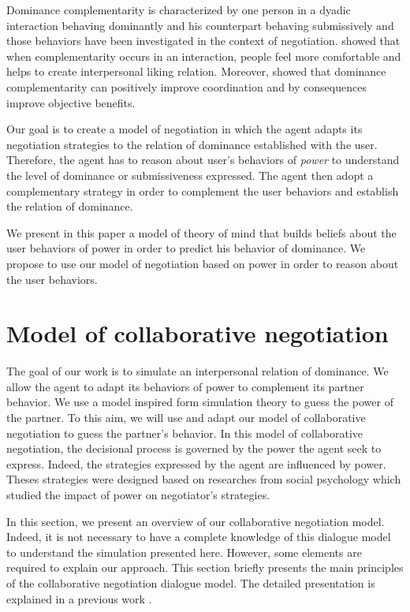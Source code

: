 \documentclass[conference, letterpaper]{IEEEtran}
\begin{document}
	Dominance complementarity is characterized by one person in a dyadic interaction behaving dominantly and his counterpart behaving submissively \cite{tiedens2003power} and those behaviors have been investigated in the context of negotiation. \cite{tiedens2003power} showed that when complementarity occurs in an interaction, people feel more comfortable and helps to create interpersonal liking relation.
	Moreover, \cite{wiltermuth2015benefits} showed that dominance complementarity can positively improve coordination and by consequences improve objective benefits.
	
	Our goal is to create a model of negotiation in which the agent adapts its negotiation strategies to the relation of dominance established with the user. Therefore, the agent has to reason about user's behaviors of \emph{power} to understand the level of dominance or submissiveness expressed. The agent then adopt a complementary strategy in order to complement the user behaviors and establish the relation of dominance.
	
	We present in this paper a model of theory of mind that builds beliefs about the user behaviors of power in order to predict his behavior of dominance. We propose to use our model of negotiation based on power in order to reason about the user behaviors. 
	
	
	\section{Model of collaborative negotiation}
	The goal of our work is to simulate an interpersonal relation of dominance. We allow the agent to adapt its behaviors of power to complement its partner behavior. We use a model inspired form simulation theory to guess the power of the partner. To this aim, we will use and adapt our model of collaborative negotiation to guess the partner's behavior. In this model of collaborative negotiation, the decisional process is governed by the power the agent seek to express. Indeed, the strategies expressed by the agent are influenced by power. Theses strategies were designed based on researches from social psychology which studied the impact of power on negotiator's strategies. 
	
	In this section, we present an overview of our collaborative negotiation model. Indeed, it is not necessary to have a complete knowledge of this dialogue model to understand the simulation presented here. However, some elements are required to explain our approach. This section briefly presents the main principles of the collaborative negotiation dialogue model. The detailed presentation is explained in a previous work \cite{ouali2017computational}.
	
\end{document}
